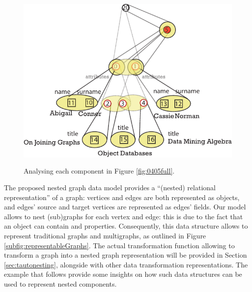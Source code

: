 \begin{figure}
\begin{minipage}{.5\textwidth}
	\label{fig:0403Expressions}
\end{minipage} 
\medskip
\centering
\begin{minipage}{.8\textwidth}
	\centering
	\includegraphics{fig/04model/0404Attributes_1}
	\label{fig:0404Attributes}
\end{minipage}\quad 
	\caption{Analysing each component in Figure \vref{fig:0405full}. }
	\label{fig:nestingexample}
\end{figure}
The proposed nested graph data model provides a ``(nested) relational representation'' of a graph: vertices and edges are both represented as objects, and edges' source and target vertices are represented as edges' fields. Our model allows to nest (sub)graphs for each vertex and edge: this is due to the fact that an object can contain  and  properties. Consequently, this data structure allows to represent traditional graphs and multigraphs, as outlined in Figure \vref{subfig:representableGraphs}. The actual transformation function allowing to transform a graph into a nested graph representation will be provided in Section \vref{sec:tautonesting}, alongside with other data transformation representations.
The example that follows provide some insights on how such data structures can be used to represent nested components.

